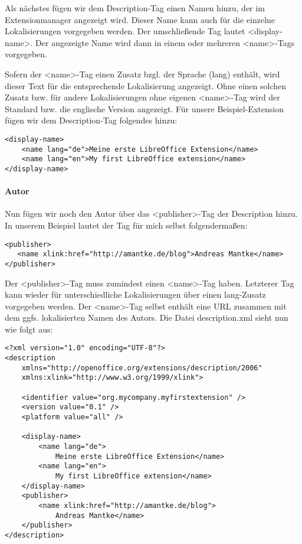 \documentclass[a4paper,10pt,pagesize,titlepage]{scrbook}
\begin{document}
Als nächstes fügen wir dem Description-Tag einen Namen hinzu, der im Extensionmanager angezeigt wird. Dieser Name kann auch für die einzelne Lokalisierungen vorgegeben werden. Der umschließende Tag lautet <display-name>.
Der angezeigte Name wird dann in einem oder mehreren <name>-Tags vorgegeben.

Sofern der <name>-Tag einen Zusatz bzgl. der Sprache (lang) enthält, wird dieser Text für die entsprechende Lokalisierung angezeigt. Ohne einen solchen Zusatz bzw. für andere Lokalisierungen ohne eigenen <name>-Tag wird der Standard bzw. die englische Version angezeigt. Für unsere Beispiel-Extension fügen wir dem Description-Tag folgendes hinzu:
\begin{lstlisting}
<display-name>
    <name lang="de">Meine erste LibreOffice Extension</name>
    <name lang="en">My first LibreOffice extension</name>
</display-name>
\end{lstlisting}

\paragraph*{Autor}$~~$\\

Nun fügen wir noch den Autor über das <publisher>-Tag der Description hinzu. In unserem Beispiel lautet der Tag für mich selbst folgendermaßen:
\begin{lstlisting}
<publisher>
   <name xlink:href="http://amantke.de/blog">Andreas Mantke</name>
</publisher>
\end{lstlisting}
Der <publisher>-Tag muss zumindest einen <name>-Tag haben. Letzterer Tag kann wieder für unterschiedliche Lokalisierungen über einen lang-Zusatz vorgegeben werden. Der <name>-Tag selbst enthält eine URL zusammen mit dem ggfs. lokalisierten Namen des Autors.
\newpage
Die Datei description.xml sieht nun wie folgt aus:
\begin{lstlisting}
<?xml version="1.0" encoding="UTF-8"?>
<description
    xmlns="http://openoffice.org/extensions/description/2006"
    xmlns:xlink="http://www.w3.org/1999/xlink">

    <identifier value="org.mycompany.myfirstextension" />
    <version value="0.1" />
    <platform value="all" />

    <display-name>
        <name lang="de">
            Meine erste LibreOffice Extension</name>
        <name lang="en">
            My first LibreOffice extension</name>
    </display-name>
    <publisher>
        <name xlink:href="http://amantke.de/blog">
            Andreas Mantke</name>
    </publisher>    
</description>
\end{lstlisting}
\end{document}

